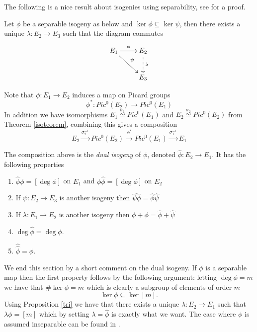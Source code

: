 The following is a nice result about isogenies using separability, see \cite{AEC} for a proof.
\begin{prop}\label{tri}
Let $\phi$ be a separable isogeny as below and $\ker \phi \subseteq \ker \psi$,
then there exists a unique $\lambda: E_2 \rightarrow E_3$ such that the diagram
commutes
$$
\xymatrix {
  E_1 \ar[r]^\phi \ar[dr]^\psi & E_2 \ar@{.>}[d]^\lambda \\
  & E_3 \\
}
$$
\end{prop}


Note that $\phi: E_1 \rightarrow E_2$ induces a map on Picard groups
$$\phi^*: Pic^0(E_2) \rightarrow Pic^0(E_1)$$
In addition we have isomorphisms $E_1 \overset{\sigma_1}{\simeq} Pic^0(E_1)$ and 
$E_2 \overset{\sigma_2}{\simeq} Pic^0(E_2)$ from Theorem \ref{isoteorem}, combining this gives a composition
$$ E_2 \overset{\sigma_2^{-1}}{\rightarrow} Pic^0(E_2) \overset{\phi^*}{\rightarrow} Pic^0(E_1)
\overset{\sigma_1^{-1}}{\rightarrow} E_1 $$

\begin{prop}
 The composition above is the \emph{dual isogeny} of $\phi$, denoted $\widehat{\phi}: E_2 \rightarrow E_1$.
It has the following properties 
\begin{enumerate}
 \item $\widehat{\phi}\phi = [\deg\phi]$ on $E_1$ and $\phi\widehat{\phi} = [\deg\phi]$ on $E_2$
 \item If $\psi: E_2 \rightarrow E_3$ is another isogeny then $\widehat{\psi \phi} = \widehat{\phi}\widehat{\psi}$
 \item If $\lambda: E_1 \rightarrow E_2$ is another isogeny then $\widehat{\phi+\phi} = \widehat{\phi}+\widehat{\psi}$
 \item $\deg\widehat{\phi} = \deg\phi$.
 \item $\widehat{\widehat{\phi}} = \phi$.
\end{enumerate}
\end{prop}

We end this section by a short comment on the dual isogeny. If $\phi$ is a separable map then
the first property follows by the following argument: letting $\deg\phi = m$ we have
that $\#\ker\phi = m$ which is clearly a subgroup of elements of order $m$
$$ \ker \phi \subseteq \ker [m].$$
Using Proposition \ref{tri} we have that there exists a unique $\lambda: E_2 \rightarrow E_1$
such that $\lambda\phi = [m]$ which by setting $\lambda =\widehat{\phi}$ is exactly what we want.
The case where $\phi$ is assumed inseparable can be found in \cite{AEC}.
